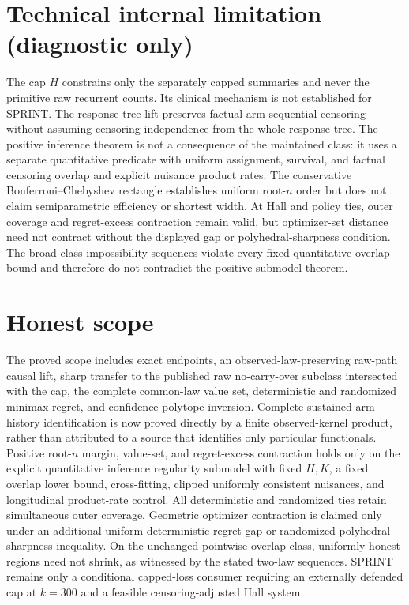 \documentclass{article}
\begin{document}
\section*{Technical internal limitation (diagnostic only)}

The cap \(H\) constrains only the separately capped summaries and never the primitive raw recurrent counts. Its clinical mechanism is not established for SPRINT. The response-tree lift preserves factual-arm sequential censoring without assuming censoring independence from the whole response tree. The positive inference theorem is not a consequence of the maintained class: it uses a separate quantitative predicate with uniform assignment, survival, and factual censoring overlap and explicit nuisance product rates. The conservative Bonferroni--Chebyshev rectangle establishes uniform root-\(n\) order but does not claim semiparametric efficiency or shortest width. At Hall and policy ties, outer coverage and regret-excess contraction remain valid, but optimizer-set distance need not contract without the displayed gap or polyhedral-sharpness condition. The broad-class impossibility sequences violate every fixed quantitative overlap bound and therefore do not contradict the positive submodel theorem.

\section{Honest scope}

The proved scope includes exact endpoints, an observed-law-preserving raw-path causal lift, sharp transfer to the published raw no-carry-over subclass intersected with the cap, the complete common-law value set, deterministic and randomized minimax regret, and confidence-polytope inversion. Complete sustained-arm history identification is now proved directly by a finite observed-kernel product, rather than attributed to a source that identifies only particular functionals. Positive root-\(n\) margin, value-set, and regret-excess contraction holds only on the explicit quantitative inference regularity submodel with fixed \(H,K\), a fixed overlap lower bound, cross-fitting, clipped uniformly consistent nuisances, and longitudinal product-rate control. All deterministic and randomized ties retain simultaneous outer coverage. Geometric optimizer contraction is claimed only under an additional uniform deterministic regret gap or randomized polyhedral-sharpness inequality. On the unchanged pointwise-overlap class, uniformly honest regions need not shrink, as witnessed by the stated two-law sequences. SPRINT remains only a conditional capped-loss consumer requiring an externally defended cap at \(k=300\) and a feasible censoring-adjusted Hall system.
\end{document}
